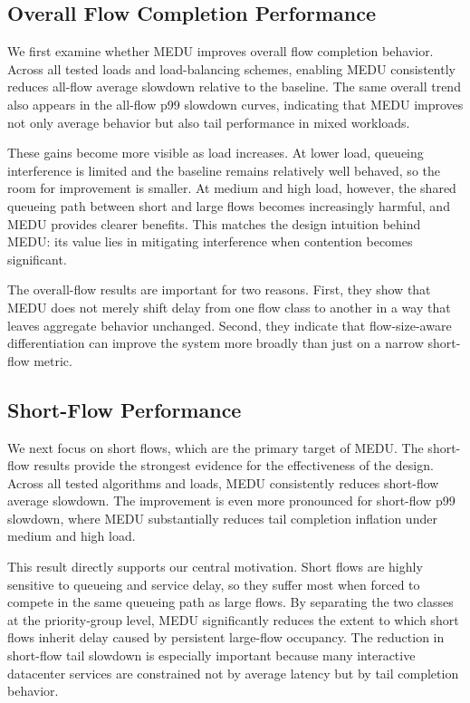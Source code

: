 \documentclass[conference]{IEEEtran}
\begin{document}
\subsection{Overall Flow Completion Performance}

We first examine whether MEDU improves overall flow completion behavior. Across all tested loads and load-balancing schemes, enabling MEDU consistently reduces all-flow average slowdown relative to the baseline. The same overall trend also appears in the all-flow p99 slowdown curves, indicating that MEDU improves not only average behavior but also tail performance in mixed workloads.

These gains become more visible as load increases. At lower load, queueing interference is limited and the baseline remains relatively well behaved, so the room for improvement is smaller. At medium and high load, however, the shared queueing path between short and large flows becomes increasingly harmful, and MEDU provides clearer benefits. This matches the design intuition behind MEDU: its value lies in mitigating interference when contention becomes significant.

The overall-flow results are important for two reasons. First, they show that MEDU does not merely shift delay from one flow class to another in a way that leaves aggregate behavior unchanged. Second, they indicate that flow-size-aware differentiation can improve the system more broadly than just on a narrow short-flow metric.

\subsection{Short-Flow Performance}

We next focus on short flows, which are the primary target of MEDU. The short-flow results provide the strongest evidence for the effectiveness of the design. Across all tested algorithms and loads, MEDU consistently reduces short-flow average slowdown. The improvement is even more pronounced for short-flow p99 slowdown, where MEDU substantially reduces tail completion inflation under medium and high load.

This result directly supports our central motivation. Short flows are highly sensitive to queueing and service delay, so they suffer most when forced to compete in the same queueing path as large flows. By separating the two classes at the priority-group level, MEDU significantly reduces the extent to which short flows inherit delay caused by persistent large-flow occupancy. The reduction in short-flow tail slowdown is especially important because many interactive datacenter services are constrained not by average latency but by tail completion behavior.
\end{document}
